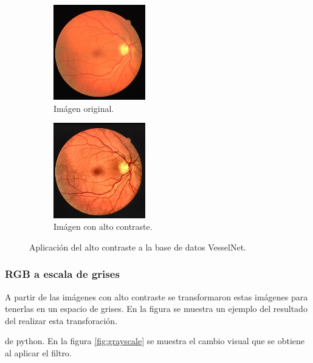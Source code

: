 \begin{figure}[H]
    \centering
    \begin{subfigure}{6cm}
        \centering
        \includegraphics[width=4cm]{Graphics/train.jpg}
        \caption{Imágen original.}
    \end{subfigure}
    \begin{subfigure}{6cm}
        \centering
        \includegraphics[width=4cm]{Graphics/high_contrast.jpg}
        \caption{Imágen con alto contraste.}
    \end{subfigure}
    \caption{Aplicación del alto contraste a la base de datos VesselNet.}
    \label{fig:high_contrast}
\end{figure}

\subsubsection{RGB a escala de grises}

A partir de las imágenes con alto contraste se transformaron estas imágenes para tenerlas en un espacio de grises. En la figura se muestra un ejemplo del resultado del realizar esta transforación.

 de python. En la figura \ref{fig:grayscale} se muestra el cambio visual que se obtiene al aplicar el filtro.

